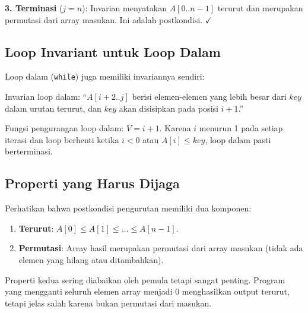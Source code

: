 \textbf{3. Terminasi} ($j = n$): Invarian menyatakan $A[0..n-1]$ terurut dan merupakan permutasi dari array masukan. Ini adalah postkondisi. $\checkmark$

\subsection{Loop Invariant untuk Loop Dalam}

Loop dalam (\texttt{while}) juga memiliki invariannya sendiri:

\begin{konsep}
Invarian loop dalam: ``$A[i+2..j]$ berisi elemen-elemen yang lebih besar dari $key$ dalam urutan terurut, dan $key$ akan disisipkan pada posisi $i+1$.''

Fungsi pengurangan loop dalam: $V = i + 1$. Karena $i$ menurun 1 pada setiap iterasi dan loop berhenti ketika $i < 0$ atau $A[i] \leq key$, loop dalam pasti berterminasi.
\end{konsep}

\subsection{Properti yang Harus Dijaga}

Perhatikan bahwa postkondisi pengurutan memiliki dua komponen:
\begin{enumerate}
    \item \textbf{Terurut}: $A[0] \leq A[1] \leq \ldots \leq A[n-1]$.
    \item \textbf{Permutasi}: Array hasil merupakan permutasi dari array masukan (tidak ada elemen yang hilang atau ditambahkan).
\end{enumerate}

Properti kedua sering diabaikan oleh pemula tetapi sangat penting. Program yang mengganti seluruh elemen array menjadi $0$ menghasilkan output terurut, tetapi jelas salah karena bukan permutasi dari masukan.
